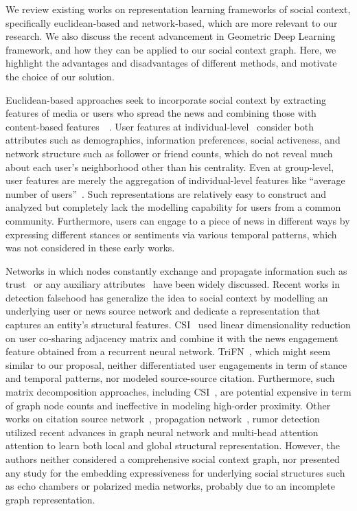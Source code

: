 \documentclass[fyp]{socreport}
\theoremstyle{definition}
\theoremstyle{hypothesis}
\begin{document}
We review existing works on representation learning frameworks of social context, specifically euclidean-based and network-based, which are more relevant to our research. We also discuss the recent advancement in Geometric Deep Learning framework, and how they can be applied to our social context graph. Here, we highlight the advantages and disadvantages of different methods, and motivate the choice of our solution.

Euclidean-based approaches seek to incorporate social context by extracting features of media or users who spread the news and combining those with content-based features~\cite{castillo2011information}~\cite{yang2012automatic}. User features at individual-level~\cite{shu2017fake} consider both attributes such as demographics, information preferences, social activeness, and network structure such as follower or friend counts, which do not reveal much about each user's neighborhood other than his centrality. Even at group-level, user features are merely the aggregation of individual-level features like ``average number of users''~\cite{ma2015detect}. Such representations are relatively easy to construct and analyzed but completely lack the modelling capability for users from a common community. Furthermore, users can engage to a piece of news in different ways by expressing different stances or sentiments via various temporal patterns, which was not considered in these early works.

Networks in which nodes constantly exchange and propagate information such as trust~\cite{kamvar2003eigentrust} or any auxiliary attributes~\cite{liao2018attributed} have been widely discussed. Recent works in detection falsehood has generalize the idea to social context by modelling an underlying user or news source network and dedicate a representation that captures an entity's structural features. CSI~\cite{ruchansky2017csi} used linear dimensionality reduction on user co-sharing adjacency matrix and combine it with the news engagement feature obtained from a recurrent neural network. TriFN~\cite{shu2019beyond}, which might seem similar to our proposal, neither differentiated user engagements in term of stance and temporal patterns, nor modeled source-source citation. Furthermore, such matrix decomposition approaches, including CSI~\cite{ruchansky2017csi}, are potential expensive in term of graph node counts and ineffective in modeling high-order proximity. Other works on citation source network~\cite{kulkarni2018multi}, propagation network~\cite{monti2019fake}, rumor detection~\cite{yuan2019jointly} utilized recent advances in graph neural network and multi-head attention attention to learn both local and global structural representation. However, the authors neither considered a comprehensive social context graph, nor presented any study for the embedding expressiveness for underlying social structures such as echo chambers or polarized media networks, probably due to an incomplete graph representation.
\end{document}

